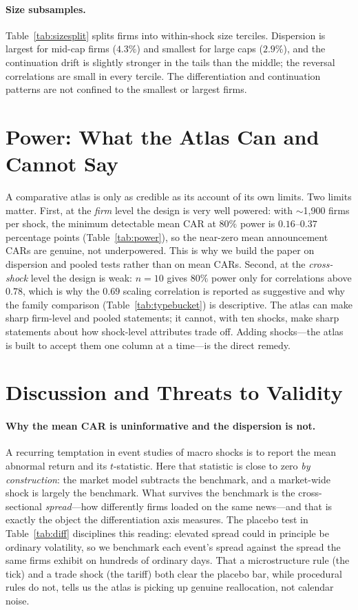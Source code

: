 \documentclass[12pt]{article}
\begin{document}
\paragraph{Size subsamples.} Table~\ref{tab:sizesplit} splits firms into within-shock size
terciles. Dispersion is largest for mid-cap firms ($4.3\%$) and smallest for large caps ($2.9\%$),
and the continuation drift is slightly stronger in the tails than the middle; the reversal
correlations are small in every tercile. The differentiation and continuation patterns are not
confined to the smallest or largest firms.

\section{Power: What the Atlas Can and Cannot Say}\label{sec:power}
A comparative atlas is only as credible as its account of its own limits. Two limits matter.
First, at the \emph{firm} level the design is very well powered: with $\sim$1{,}900 firms per shock,
the minimum detectable mean CAR at $80\%$ power is $0.16$--$0.37$ percentage points
(Table~\ref{tab:power}), so the near-zero mean announcement CARs are genuine, not underpowered. This
is why we build the paper on dispersion and pooled tests rather than on mean CARs. Second, at the
\emph{cross-shock} level the design is weak: $n=10$ gives $80\%$ power only for correlations above
$0.78$, which is why the $0.69$ scaling correlation is reported as suggestive and why the family
comparison (Table~\ref{tab:typebucket}) is descriptive. The atlas can make sharp firm-level and
pooled statements; it cannot, with ten shocks, make sharp statements about how shock-level
attributes trade off. Adding shocks---the atlas is built to accept them one column at a time---is the
direct remedy.

\section{Discussion and Threats to Validity}\label{sec:threats}
\paragraph{Why the mean CAR is uninformative and the dispersion is not.} A recurring temptation in
event studies of macro shocks is to report the mean abnormal return and its $t$-statistic. Here that
statistic is close to zero \emph{by construction}: the market model subtracts the benchmark, and a
market-wide shock is largely the benchmark. What survives the benchmark is the cross-sectional
\emph{spread}---how differently firms loaded on the same news---and that is exactly the object the
differentiation axis measures. The placebo test in Table~\ref{tab:diff} disciplines this reading:
elevated spread could in principle be ordinary volatility, so we benchmark each event's spread
against the spread the same firms exhibit on hundreds of ordinary days. That a microstructure rule
(the tick) and a trade shock (the tariff) both clear the placebo bar, while procedural rules do not,
tells us the atlas is picking up genuine reallocation, not calendar noise.
\end{document}
